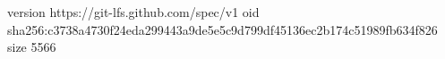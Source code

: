 version https://git-lfs.github.com/spec/v1
oid sha256:c3738a4730f24eda299443a9de5e5c9d799df45136ec2b174c51989fb634f826
size 5566
